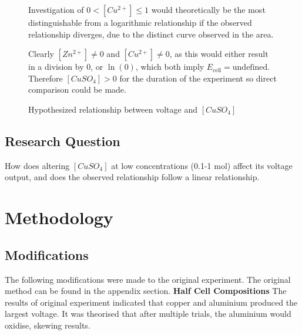 \documentclass[11pt,a4paper]{article}
\begin{document}
\begin{figure}[h]
\begin{minipage}{0.6\textwidth}
	
	
\caption{Hypothesized relationship between voltage and $\left[CuSO_4\right]$	}
\end{minipage}%
\begin{minipage}{0.02\textwidth}
	\hspace*{0.001cm}
\end{minipage}
\begin{minipage}{0.38\textwidth}
Investigation of $0<[Cu^{2+}]\leq1$ would theoretically be the most distinguishable from a logarithmic relationship if the observed relationship diverges, due to the distinct curve observed in the area.

Clearly $[Zn^{2+}]\neq 0$ and $[Cu^{2+}]\neq 0$, as this would either result in a division by 0, or $\ln(0)$, which both imply $E_\textrm{cell}=\textrm{undefined}$. Therefore $[CuSO_4]>0$ for the duration of the experiment so direct comparison could be made.
\end{minipage}
\end{figure}





\subsection{Research Question}
How does altering $[CuSO_4]$ at low concentrations (0.1-1 mol) affect its voltage output, and does the observed relationship follow a linear relationship.
\section{Methodology}
\subsection{Modifications}

The following modifications were made to the original experiment. The original method can be found in the appendix section.\newline
\textbf{Half Cell Compositions}\newline
The results of original experiment indicated that copper and aluminium produced the largest voltage. It was theorised that after multiple trials, the aluminium would oxidise, skewing results.
\end{document}

